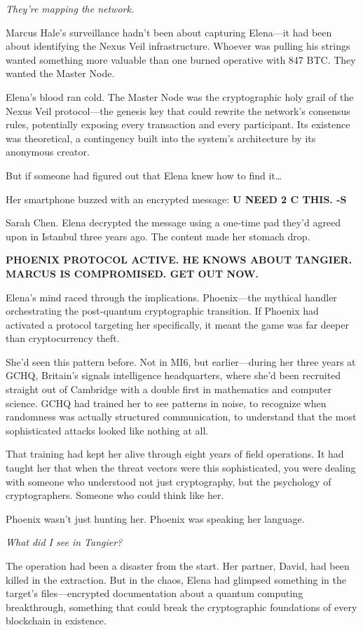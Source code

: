 \emph{They're mapping the network.}

Marcus Hale's surveillance hadn't been about capturing Elena---it had been about identifying the Nexus Veil infrastructure. Whoever was pulling his strings wanted something more valuable than one burned operative with 847 BTC. They wanted the Master Node.

Elena's blood ran cold. The Master Node was the cryptographic holy grail of the Nexus Veil protocol---the genesis key that could rewrite the network's consensus rules, potentially exposing every transaction and every participant. Its existence was theoretical, a contingency built into the system's architecture by its anonymous creator.

But if someone had figured out that Elena knew how to find it\ldots{}

Her smartphone buzzed with an encrypted message: \textbf{U NEED 2 C THIS. -S}

Sarah Chen. Elena decrypted the message using a one-time pad they'd agreed upon in Istanbul three years ago. The content made her stomach drop.

\textbf{PHOENIX PROTOCOL ACTIVE. HE KNOWS ABOUT TANGIER. MARCUS IS COMPROMISED. GET OUT NOW.}

Elena's mind raced through the implications. Phoenix---the mythical handler orchestrating the post-quantum cryptographic transition. If Phoenix had activated a protocol targeting her specifically, it meant the game was far deeper than cryptocurrency theft.

She'd seen this pattern before. Not in MI6, but earlier---during her three years at GCHQ, Britain's signals intelligence headquarters, where she'd been recruited straight out of Cambridge with a double first in mathematics and computer science. GCHQ had trained her to see patterns in noise, to recognize when randomness was actually structured communication, to understand that the most sophisticated attacks looked like nothing at all.

That training had kept her alive through eight years of field operations. It had taught her that when the threat vectors were this sophisticated, you were dealing with someone who understood not just cryptography, but the psychology of cryptographers. Someone who could think like her.

Phoenix wasn't just hunting her. Phoenix was speaking her language.

\emph{What did I see in Tangier?}

The operation had been a disaster from the start. Her partner, David, had been killed in the extraction. But in the chaos, Elena had glimpsed something in the target's files---encrypted documentation about a quantum computing breakthrough, something that could break the cryptographic foundations of every blockchain in existence.

